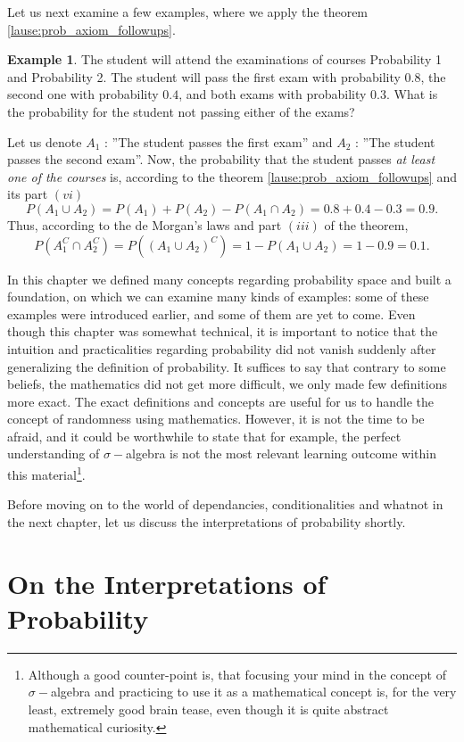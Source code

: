 \documentclass[12pt,a4paper,leqno]{report}
\theoremstyle{plain}
\theoremstyle{definition}
\newtheorem{esim}[equation]{Example}
\begin{document}
Let us next examine a few examples, where we apply the theorem \ref{lause:prob_axiom_followups}.

\begin{esim}
The student will attend the examinations of courses Probability 1 and Probability 2. The student will pass the first exam with probability $0.8$, the second one with probability $0.4$, and both exams with probability $0.3$. What is the probability for the student not passing either of the exams?

Let us denote $A_1$  : ''The student passes the first exam'' and $A_2$ : ''The student passes the second exam''. Now, the probability that the student passes \emph{at least one of the courses} is, according to the theorem \ref{lause:prob_axiom_followups} and its part $(vi)$
\[
P(A_1 \cup A_2) = P(A_1) + P(A_2) - P(A_1 \cap A_2) = 0.8 + 0.4 - 0.3 = 0.9.
\]
Thus, according to the de Morgan's laws and part $(iii)$ of the theorem, 
\[
P(A_1^C \cap A_2^C) = P((A_1 \cup A_2)^C) = 1 - P(A_1 \cup A_2) = 1- 0.9 = 0.1.
\]
\end{esim}

In this chapter we defined many concepts regarding probability space and built a foundation, on which we can examine many kinds of examples: some of these examples were introduced earlier, and some of them are yet to come. Even though this chapter was somewhat technical, it is important to notice that the intuition and practicalities regarding probability did not vanish suddenly after generalizing the definition of probability. It suffices to say that contrary to some beliefs, the mathematics did not get more difficult, we only made few definitions more exact. The exact definitions and concepts are useful for us to handle the concept of randomness using mathematics. However, it is not the time to be afraid, and it could be worthwhile to state that for example, the perfect understanding of $\sigma-$algebra is not the most relevant learning outcome within this material\footnote{Although a good counter-point is, that focusing your mind in the concept of $\sigma-$algebra and practicing to use it as a mathematical concept is, for the very least, extremely good brain tease, even though it is quite abstract mathematical curiosity.}.

Before moving on to the world of dependancies, conditionalities and whatnot in the next chapter, let us discuss the interpretations of probability shortly.

\section{On the Interpretations of Probability}\label{interpreting}
\end{document}
